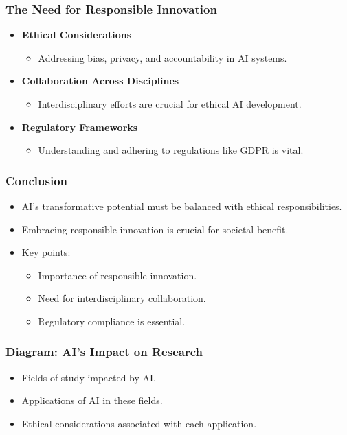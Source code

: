 \documentclass[aspectratio=169]{beamer}
\begin{document}
\begin{frame}[fragile]
    \frametitle{The Need for Responsible Innovation}
    \begin{itemize}
        \item \textbf{Ethical Considerations}
            \begin{itemize}
                \item Addressing bias, privacy, and accountability in AI systems.
            \end{itemize}
        \item \textbf{Collaboration Across Disciplines}
            \begin{itemize}
                \item Interdisciplinary efforts are crucial for ethical AI development.
            \end{itemize}
        \item \textbf{Regulatory Frameworks}
            \begin{itemize}
                \item Understanding and adhering to regulations like GDPR is vital.
            \end{itemize}
    \end{itemize}
\end{frame}

\begin{frame}[fragile]
    \frametitle{Conclusion}
    \begin{itemize}
        \item AI's transformative potential must be balanced with ethical responsibilities.
        \item Embracing responsible innovation is crucial for societal benefit.
        \item Key points:
            \begin{itemize}
                \item Importance of responsible innovation.
                \item Need for interdisciplinary collaboration.
                \item Regulatory compliance is essential.
            \end{itemize}
    \end{itemize}
\end{frame}

\begin{frame}[fragile]
    \frametitle{Diagram: AI’s Impact on Research}
    \begin{itemize}
        \item Fields of study impacted by AI.
        \item Applications of AI in these fields.
        \item Ethical considerations associated with each application.
    \end{itemize}
\end{frame}
\end{document}
